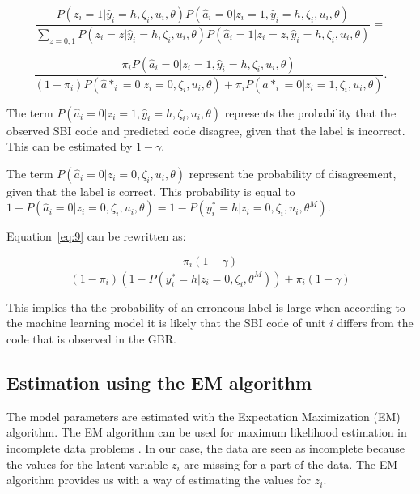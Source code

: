 \documentclass[12pt, a4paper, titlepage]{article}
\begin{document}
						\begin{equation}\label{eq:8}
\frac{P(z_i = 1|\hat{y}_i = h, \zeta_i, u_i, \theta) P(\hat{a}_i=0|z_i=1, \hat{y}_i = h, \zeta_i, u_i, \theta) }
{\sum_{z=0,1}P(z_i=z|\hat{y}_i = h, \zeta_i, u_i, \theta) P( \hat{a}_i=1|z_i=z, \hat{y}_i = h, \zeta_i, u_i, \theta  )} =
						\end{equation}

						\begin{equation}\label{eq:9}
\frac{\pi_i P(\hat{a}_i=0|z_i=1, \hat{y}_i = h, \zeta_i, u_i, \theta) }
{(1-\pi_i)P(\hat{a}*_i = 0 | z_i = 0, \zeta_i, u_i, \theta) + \pi_i P(\hat{a}*_i = 0 | z_i = 1, \zeta_i, u_i, \theta) } .
						\end{equation}

The term $P(\hat{a}_i= 0|z_i = 1, \hat{y}_i = h, \zeta_i, u_i, \theta)$ represents the probability that the observed SBI code and predicted code disagree, given that the label is incorrect. This can be estimated by $1-\gamma$.

The term $P(\hat{a}_i = 0 | z_i = 0, \zeta_i, u_i, \theta)$ represent the probability of disagreement, given that the label is correct. This probability is equal to $1 - P(\hat{a}_i = 0 | z_i = 0, \zeta_i, u_i, \theta) = 1 - P(y^*_i = h | z_i = 0, \zeta_i, u_i, \theta^M)$. 

Equation~\ref{eq:9} can be rewritten as:

						\begin{equation}\label{eq:10}
\frac{\pi_i (1-\gamma)}{(1-\pi_i)(1-P(y^*_i = h | z_i = 0, \zeta_i, \theta^M)) + \pi_i (1-\gamma)}
						\end{equation}


This implies tha the probability of an erroneous label is large when according to the machine learning model it is likely that the SBI code of unit $i$ differs from the code that is observed in the GBR.

					\subsection{Estimation using the EM algorithm}
					\label{section:em}

The model parameters are estimated with the Expectation Maximization (EM) algorithm. The EM algorithm can be used for maximum likelihood estimation in incomplete data problems \citep{Rubin}. In our case, the data are seen as incomplete because the values for the latent variable $z_i$ are missing for a part of the data. The EM algorithm provides us with a way of estimating the values for $z_i$.
\end{document}
